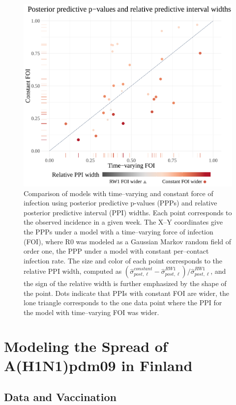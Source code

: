 \begin{figure}[htbp]
	\centering
	\includegraphics[width=0.6\linewidth]{figures/sinfoi_ppi_comp}
	\caption[Comparison with posterior predictive p-values and relative predictive interval widths for SIRS models fit to an outbreak with time--varying dynamics.]{Comparison of models with time--varying and constant force of infection using posterior predictive p-values (PPPs) and relative posterior predictive interval (PPI) widths. Each point corresponds to the observed incidence in a given week. The X--Y coordinates give the PPPs under a model with a time--varying force of infection (FOI), where R0 was modeled as a Gaussian Markov random field of order one, the PPP under a model with constant per--contact infection rate. The size and color of each point corresponds to the relative PPI width, computed as $ (\widehat{\sigma}_{post,\ell}^{constant} - \widehat{\sigma}_{post,\ell}^{RW1})/\widehat{\sigma}_{post,\ell}^{RW1} $, and the sign of the relative width is further emphasized by the shape of the point. Dots indicate that PPIs with constant FOI are wider, the lone triangle corresponds to the one data point where the PPI for the model with time--varying FOI was wider.}
	\label{fig:sinfoi_ppi_comp}
\end{figure}

\newpage
\section{Modeling the Spread of A(H1N1)pdm09 in Finland}
\label{sec:flu_tparam_models}

\subsection{Data and Vaccination}
\label{subsec:flu_datavacc}

